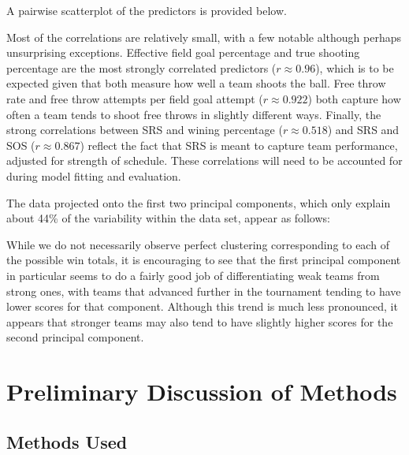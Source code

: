 \documentclass[10pt,a4paper, hidelinks]{article} %
\begin{document}
A pairwise scatterplot of the predictors is provided below.


Most of the correlations are relatively small, with a few notable although perhaps unsurprising exceptions. Effective field goal percentage and true shooting percentage are the most strongly correlated predictors ($r \approx 0.96$), which is to be expected given that both measure how well a team shoots the ball. Free throw rate and free throw attempts per field goal attempt ($r \approx 0.922$) both capture how often a team tends to shoot free throws in slightly different ways. Finally, the strong correlations between SRS and wining percentage ($r \approx 0.518$) and SRS and SOS ($r \approx 0.867$) reflect the fact that SRS is meant to capture team performance, adjusted for strength of schedule. These correlations will need to be accounted for during model fitting and evaluation.

The data projected onto the first two principal components, which only explain about 44\% of the variability within the data set, appear as follows:


While we do not necessarily observe perfect clustering corresponding to each of the possible win totals, it is encouraging to see that the first principal component in particular seems to do a fairly good job of differentiating weak teams from strong ones, with teams that advanced further in the tournament tending to have lower scores for that component. Although this trend is much less pronounced, it appears that stronger teams may also tend to have slightly higher scores for the second principal component. 

\section{Preliminary Discussion of Methods}

\subsection{Methods Used}
\lipsum
\end{document}
